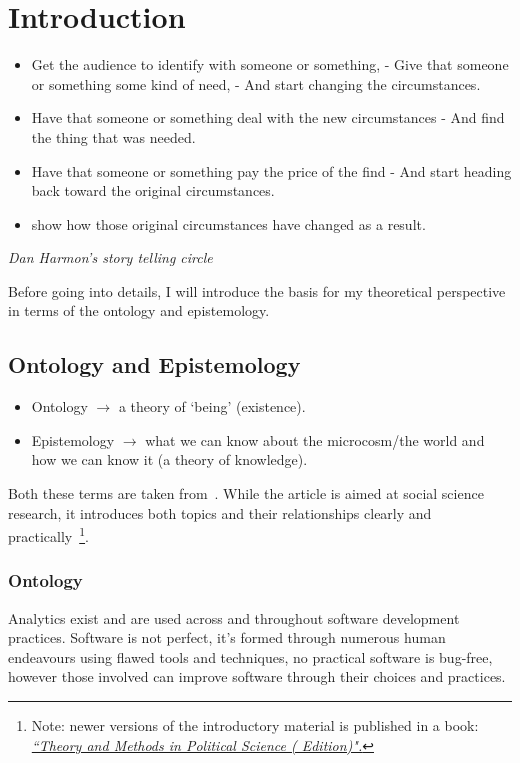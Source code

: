 \chapter{Introduction}

\begin{itemize}
    \item Get the audience to identify with someone or something, - Give that someone or something some kind of need, - And start changing the circumstances.
    \item Have that someone or something deal with the new circumstances - And find the thing that was needed.
    \item Have that someone or something pay the price of the find - And start heading back toward the original circumstances.
    \item show how those original circumstances have changed as a result.
\end{itemize}
\emph{Dan Harmon's story telling circle}

Before going into details, I will introduce the basis for my theoretical perspective in terms of the ontology and epistemology.

\section{Ontology and Epistemology}
\begin{itemize}
    \item Ontology \( \rightarrow \) a theory of `being' (existence).
    \item Epistemology \( \rightarrow \) what we can know about the microcosm/the world and how we can know it (a theory of knowledge).
\end{itemize}

Both these terms are taken from~\cite{marsh2002skin}. While the article is aimed at social science research, it introduces both topics and their relationships clearly and practically~\footnote{Note: newer versions of the introductory material is published in a book: \href{https://www.macmillanihe.com/page/detail/Theory-and-Methods-in-Political-Science/?K=9781137603517}{\emph{``Theory and Methods in Political Science ( Edition)".}}}.

\subsection{Ontology}
Analytics exist and are used across and throughout software development practices. Software is not perfect, it's formed through numerous human endeavours using flawed tools and techniques, no practical software is bug-free, however those involved can improve software through their choices and practices.


